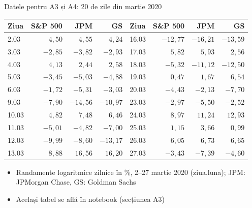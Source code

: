 \begin{frame}{Datele pentru A3 și A4: 20 de zile din martie 2020}
\itemsize{\footnotesize}
\begin{center}
\scriptsize
\begin{tabular}{lrrr|lrrr}
\toprule
Ziua & S\&P 500 & JPM & GS & Ziua & S\&P 500 & JPM & GS \\
\midrule
2.03 & $4{,}50$ & $4{,}55$ & $4{,}24$ & 16.03 & $-12{,}77$ & $-16{,}21$ & $-13{,}59$ \\
3.03 & $-2{,}85$ & $-3{,}82$ & $-2{,}93$ & 17.03 & $5{,}82$ & $5{,}93$ & $2{,}56$ \\
4.03 & $4{,}13$ & $2{,}44$ & $2{,}58$ & 18.03 & $-5{,}32$ & $-11{,}12$ & $-12{,}50$ \\
5.03 & $-3{,}45$ & $-5{,}03$ & $-4{,}88$ & 19.03 & $0{,}47$ & $1{,}67$ & $6{,}54$ \\
6.03 & $-1{,}72$ & $-5{,}31$ & $-3{,}03$ & 20.03 & $-4{,}43$ & $-2{,}13$ & $-7{,}70$ \\
9.03 & $-7{,}90$ & $-14{,}56$ & $-10{,}97$ & 23.03 & $-2{,}97$ & $-5{,}50$ & $-2{,}52$ \\
10.03 & $4{,}82$ & $7{,}48$ & $6{,}46$ & 24.03 & $8{,}97$ & $11{,}24$ & $12{,}93$ \\
11.03 & $-5{,}01$ & $-4{,}82$ & $-7{,}00$ & 25.03 & $1{,}15$ & $3{,}66$ & $0{,}99$ \\
12.03 & $-9{,}99$ & $-8{,}60$ & $-13{,}17$ & 26.03 & $6{,}05$ & $6{,}73$ & $6{,}65$ \\
13.03 & $8{,}88$ & $16{,}56$ & $16{,}20$ & 27.03 & $-3{,}43$ & $-7{,}39$ & $-4{,}60$ \\
\bottomrule
\end{tabular}
\end{center}
\begin{itemize}
    \item Randamente logaritmice zilnice în \%, 2--27 martie 2020 (ziua.luna); JPM: JPMorgan Chase, GS: Goldman Sachs
    \item Același tabel se află în notebook (secțiunea A3)
\end{itemize}
\end{frame}

